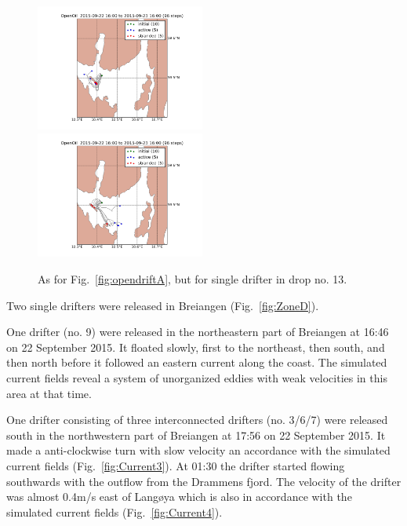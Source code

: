 \documentclass[12pt,a4paper,english]{article}
\begin{document}
\begin{figure}[ht]
\centerline{
\includegraphics*[width=0.495\textwidth]{Opendrift_simulations/dropzone_D_no13_fjordos_arome}
\includegraphics*[width=0.495\textwidth]{Opendrift_simulations/dropzone_D_no13_norkyst_arome}
}
\caption{\small
As for Fig.~\ref{fig:opendriftA}, but for single drifter in drop no. 13.
}
\label{fig:opendriftD2}
\end{figure}
%
Two single drifters were released in Breiangen (Fig.~\ref{fig:ZoneD}).

One drifter (no. 9) were released in the northeastern part of Breiangen at 16:46 on 22 September 2015. It floated slowly, first to the northeast, then south, and then north before it followed an eastern current along the coast. The simulated current fields reveal a system of unorganized eddies with weak velocities in this area at that time.

One drifter consisting of three interconnected drifters (no. 3/6/7) were released south in the northwestern part of Breiangen at 17:56 on 22 September 2015. It made a anti-clockwise turn with slow velocity an accordance with the simulated current fields (Fig.~\ref{fig:Current3}). At 01:30 the drifter started flowing southwards with the outflow from the Drammens fjord. The velocity of the drifter was almost 0.4m/s east of Lang\o ya which is also in accordance with the simulated current fields (Fig.~\ref{fig:Current4}).   

\clearpage
\end{document}
